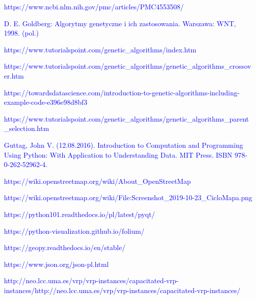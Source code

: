 \documentclass[a4paper, twoside, 12pt, justified]{article}
\begin{document}
\begin{thebibliography}{}
		{\hypertarget{bees_code}{\textcolor{blue}{
		https://www.ncbi.nlm.nih.gov/pmc/articles/PMC4553508/}}}

		
		{\hypertarget{ag}{\textcolor{blue}{
		D. E. Goldberg: Algorytmy genetyczne i ich zastosowania. Warszawa: WNT, 1998. (pol.)}}}
	
		{\hypertarget{ag_operators}{\textcolor{blue}{
		https://www.tutorialspoint.com/genetic\_algorithms/index.htm}}}
	
		{\hypertarget{cross}{\textcolor{blue}{
		https://www.tutorialspoint.com/genetic\_algorithms/genetic\_algorithms\_crossover.htm}}}
	
		{\hypertarget{mutation}{\textcolor{blue}{
		https://towardsdatascience.com/introduction-to-genetic-algorithms-including-example-code-e396e98d8bf3}}}
	
		{\hypertarget{selection}{\textcolor{blue}{
		https://www.tutorialspoint.com/genetic\_algorithms/genetic\_algorithms\_parent\_selection.htm}}}
	
		{\hypertarget{python}{\textcolor{blue}{
		 Guttag, John V. (12.08.2016). Introduction to Computation and Programming Using Python: With Application to Understanding Data. MIT Press. ISBN 978-0-262-52962-4.}}}
	 
	 	{\hypertarget{osm}{\textcolor{blue}{
		https://wiki.openstreetmap.org/wiki/About\_OpenStreetMap}}}
		
		
		{\hypertarget{osm_photo}{\textcolor{blue}{
		https://wiki.openstreetmap.org/wiki/File:Screenshot\_2019-10-23\_CicloMapa.png
		}}}
	
		{\hypertarget{pyqt}{\textcolor{blue}{
		https://python101.readthedocs.io/pl/latest/pyqt/
		}}}
	
	
		{\hypertarget{folium}{\textcolor{blue}{
		https://python-visualization.github.io/folium/
		}}}
	
		{\hypertarget{geopy}{\textcolor{blue}{
		https://geopy.readthedocs.io/en/stable/
		}}}
	
		{\hypertarget{json}{\textcolor{blue}{
		https://www.json.org/json-pl.html
		}}}
	
		{\hypertarget{tests}{\textcolor{blue}{
		http://neo.lcc.uma.es/vrp/vrp-instances/capacitated-vrp-instances/http://neo.lcc.uma.es/vrp/vrp-instances/capacitated-vrp-instances/
		}}}
	
		

	\end{thebibliography}
	
	
	
\end{document}
